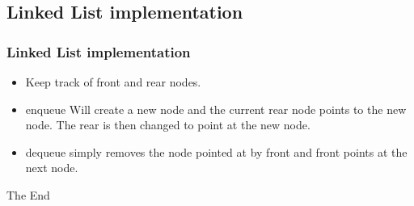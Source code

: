 \documentclass{beamer}
\begin{document}
\subsection{Linked List implementation}
\begin{frame}
\frametitle{Linked List implementation}
\begin{itemize}
\item Keep track of front and rear nodes.
\item {\color{orange} enqueue} Will create a new node and the current rear node points to the new node. The rear is then changed to point at the new node.
\item {\color{magenta} dequeue} simply removes the node pointed at by front and front points at the next node.
\end{itemize}
\end{frame}

\begin{frame} 
\Huge{\centerline{The End}}
\end{frame}
\end{document}
